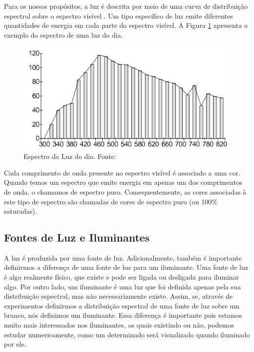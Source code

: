 \par
Para os nossos propósitos, a luz é descrita por meio de uma curva de
distribuição espectral sobre o espectro visível . Um tipo específico de luz
emite diferentes quantidades de energia em cada parte do espectro visível. A
Figura \ref{fig:visible_spectrum} apresenta o exemplo do espectro de uma luz do
dia.

\begin{figure}[!htb]
     \centering
     \includegraphics[scale=0.6]{img/spectrum_light.png}
     \caption{Espectro da Luz do dia. Fonte:
}
     \label{fig:visible_spectrum}
\end{figure}

\par
Cada comprimento de onda presente no espectro visível é associado a uma cor.
Quando temos um espectro que emite energia em apenas um dos comprimentos de
onda, o chamamos de espectro puro. Consequentemente, as cores associadas à
este tipo de espectro são chamadas de cores de espectro puro (ou 100\%
saturadas).

\subsection{Fontes de Luz e Iluminantes}
\par
A luz é produzida por uma fonte de luz. Adicionalmente, também é importante
definirmos a diferença de uma fonte de luz para um iluminante.
Uma fonte de luz é algo realmente físico, que existe e pode ser ligada ou
desligada para iluminar algo. Por outro lado, um iluminante é uma luz que foi
definida apenas pela sua distribuição espectral, mas não necessariamente existe.
Assim, se, através de experimentos definirmos a distribuição espectral de uma
fonte de luz sobre um branco, nós definimos um iluminante. Essa diferença é
importante pois estamos muito mais interessados nos iluminantes, os quais
existindo ou não, podemos estudar numericamente, como um determinado será
visualizado quando iluminado por ele.

